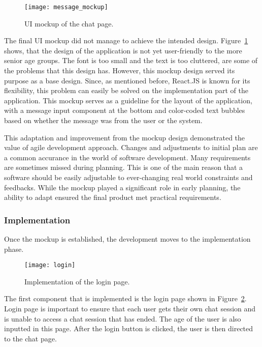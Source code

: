 \begin{figure}[h!]
    \centering
    \texttt{[image: message\_mockup]}
    \caption{\ac{UI} mockup of the chat page.}\label{mockup}
\end{figure}

The final \ac{UI} mockup did not manage to achieve the intended design.
Figure~\ref{mockup} shows, that the design of the application is not yet user-friendly to the more senior age groups.
The font is too small and the text is too cluttered, are some of the problems that this design has.
However, this mockup design served its purpose as a base design.
Since, as mentioned before, React.JS is known for its flexibility, this problem can easily be solved on the implementation part of the application. 
This mockup serves as a guideline for the layout of the application, with a message input component at the bottom and color-coded text bubbles based on whether the message was from the user or the system.

This adaptation and improvement from the mockup design demonstrated the value of agile development approach.
Changes and adjustments to initial plan are a common accurance in the world of software development.
Many requirements are sometimes missed during planning.
This is one of the main reason that a software should be easily adjustable to ever-changing real world constraints and feedbacks.
While the mockup played a significant role in early planning, the ability to adapt ensured the final product met practical requirements.
 
\subsubsection{Implementation}

Once the mockup is established, the development moves to the implementation phase.

\begin{figure}[h!]
    \centering
    \texttt{[image: login]}
    \caption{Implementation of the login page.}\label{login}
\end{figure}

The first component that is implemented is the login page shown in Figure~\ref{login}.
Login page is important to ensure that each user gets their own chat session and is unable to access a chat session that has ended.
The age of the user is also inputted in this page.
After the login button is clicked, the user is then directed to the chat page.


